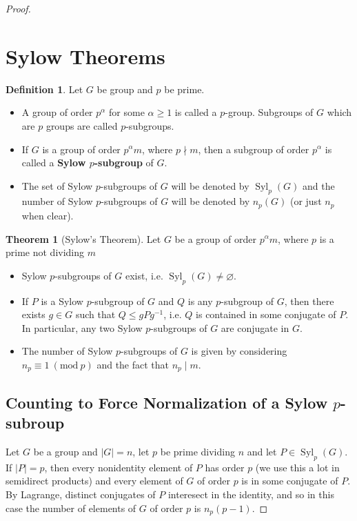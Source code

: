 \documentclass[9pt,reqno]{amsart}
\theoremstyle{definition}
\newtheorem{defi}{Definition}[section]
\newtheorem{theorem}{Theorem}[section]
\DeclareMathOperator{\syl}{Syl}
\newcommand{\Mod}[1]{\ (\mathrm{mod}\ #1)}
\begin{document}
\begin{proof}
\section{Sylow Theorems} 
\begin{defi}
Let $G$ be group and $p$ be prime. 
\begin{itemize}
	\item A group of order $p^\alpha$ for some $\alpha \geq 1$ is called a $p$-group. Subgroups of $G$ which are $p$ groups are called $p$-subgroups.
	\item If $G$ is a group of order $p^\alpha m$, where $p \nmid m$, then a subgroup of order $p^\alpha$ is called a \textbf{Sylow $p$-subgroup} of $G$.
	\item The set of Sylow $p$-subgroups of $G$ will be denoted by $\syl_p (G)$ and the number of Sylow $p$-subgroups of $G$ will be denoted by $n_p (G)$ (or just $n_p$ when clear).
\end{itemize}	
\end{defi}
\begin{theorem}[Sylow's Theorem] Let $G$ be a group of order $p^\alpha m$, where $p$ is a prime not dividing $m$
	\begin{itemize}
		\item Sylow $p$-subgroups of $G$ exist, i.e. $\syl_p (G) \neq \varnothing$.
		\item If $P$ is a Sylow $p$-subgroup of $G$ and $Q$ is any $p$-subgroup of $G$, then there exists $g \in G$ such that $Q \leq gPg^{-1}$, i.e. $Q$ is contained in some conjugate of $P$. In particular, any two Sylow $p$-subgroups of $G$ are conjugate in $G$.
		\item The number of Sylow $p$-subgroups of $G$ is given by considering $n_p \equiv 1 \Mod{p}$ and the fact that $n_p \mid m$. 
	\end{itemize}
\end{theorem}
\subsection{Counting to Force Normalization of a Sylow $p$-subroup}


Let $G$ be a group and $|G| = n$, let $p$ be prime dividing $n$ and let $P \in \syl_p (G)$. If $|P| = p$, then every nonidentity element of $P$ has order $p$ (we use this a lot in semidirect products) and every element of $G$ of order $p$ is in some conjugate of $P$. By Lagrange, distinct conjugates of $P$ interesect in the identity, and so in this case the number of elements of $G$ of order $p$ is $n_p (p-1)$. 


\end{proof}
\end{document}
